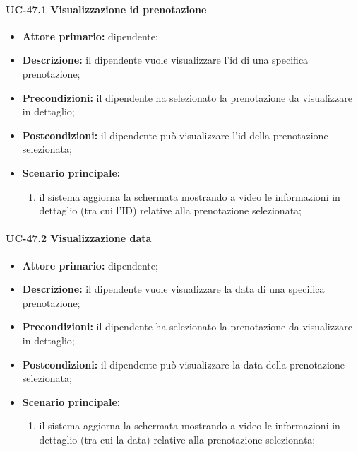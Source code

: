 \paragraph{UC-47.1 Visualizzazione id prenotazione}
    
    \begin{itemize}
        \item \textbf{Attore primario:} dipendente;

        \item \textbf{Descrizione:} il dipendente vuole visualizzare l'id di una specifica prenotazione;

        \item \textbf{Precondizioni:} il dipendente ha selezionato la prenotazione da visualizzare in dettaglio;

        \item \textbf{Postcondizioni:} il dipendente può visualizzare l'id della prenotazione selezionata;

        \item \textbf{Scenario principale:}
            \begin{enumerate}
                 \item il sistema aggiorna la schermata mostrando a video le informazioni in dettaglio (tra cui l'ID) relative alla prenotazione selezionata;
            \end{enumerate}
    \end{itemize}

\paragraph{UC-47.2 Visualizzazione data}

    \begin{itemize}
        \item \textbf{Attore primario:} dipendente;

        \item \textbf{Descrizione:} il dipendente vuole visualizzare la data di una specifica prenotazione;

        \item \textbf{Precondizioni:} il dipendente ha selezionato la prenotazione da visualizzare in dettaglio;

        \item \textbf{Postcondizioni:} il dipendente può visualizzare la data della prenotazione selezionata;

        \item \textbf{Scenario principale:}
            \begin{enumerate}
                 \item il sistema aggiorna la schermata mostrando a video le informazioni in dettaglio (tra cui la data) relative alla prenotazione selezionata;
            \end{enumerate}
    \end{itemize} 

